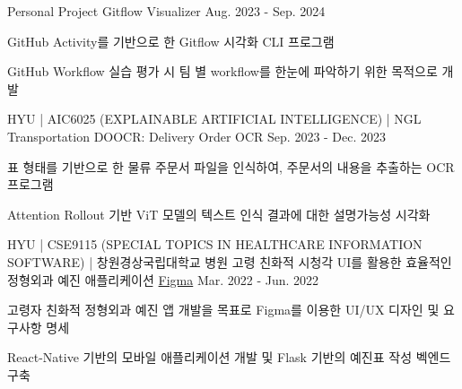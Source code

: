 



\begin{cventries}
  \cventry
  {Personal Project} %
  {Gitflow Visualizer} %
  {\href{https://github.com/Verssae/gitflow-visualizer}{\githubCode}} %
  {Aug. 2023 - Sep. 2024} %
  {
    \begin{cvitems} %
      \item {GitHub Activity를 기반으로 한 Gitflow 시각화 CLI 프로그램}
      \item {GitHub Workflow 실습 평가 시 팀 별 workflow를 한눈에 파악하기 위한 목적으로 개발}
    \end{cvitems}
  }

  \cventry
  {\faUniversity \space HYU | AIC6025 (EXPLAINABLE ARTIFICIAL INTELLIGENCE) | \faBuilding[regular] NGL Transportation} %
  {DOOCR: Delivery Order OCR} %
  {\href{https://github.com/Verssae/doocr}{\githubCode}} %
  {Sep. 2023 - Dec. 2023} %
  {
    \begin{cvitems} %
      \item {표 형태를 기반으로 한 물류 주문서 파일을 인식하여, 주문서의 내용을 추출하는 OCR 프로그램}
      \item {Attention Rollout 기반 ViT 모델의 텍스트 인식 결과에 대한 설명가능성 시각화}
    \end{cvitems}
  }

  \cventry
  {\faUniversity \space HYU | CSE9115 (SPECIAL TOPICS IN HEALTHCARE INFORMATION SOFTWARE) | \faHospital[regular] 창원경상국립대학교 병원 } 
  {고령 친화적 시청각 UI를 활용한 효율적인 정형외과 예진 애플리케이션} %
  {\href{https://www.figma.com/design/DY4l2tZ6kkIiZmN0NMk8Lo/Medical?node-id=0-1&t=JGXwtRfDt9z0oH3N-1}{\faFigma\space Figma} \space \href{https://github.com/Verssae/cse9115-medical-app}{\githubCode} } %
  {Mar. 2022 - Jun. 2022} %
  {
    \begin{cvitems} %
      \item {고령자 친화적 정형외과 예진 앱 개발을 목표로 Figma를 이용한 UI/UX 디자인 및 요구사항 명세}
      \item {React-Native 기반의 모바일 애플리케이션 개발 및 Flask 기반의 예진표 작성 벡엔드 구축}
    \end{cvitems}
  }


\end{cventries}
